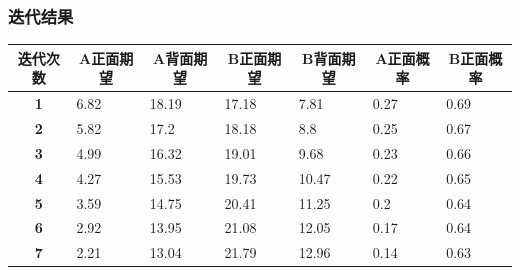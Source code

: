 \documentclass[UTF8]{ctexbeamer}
\numberwithin{equation}{section}  %
\begin{document}
\begin{frame}
    \frametitle{迭代结果}
\begin{table}[htbp]
    \centering
\begin{tabular}{cllllll}
        \toprule
\textbf{迭代次数} & \multicolumn{1}{c}{\textbf{A正面期望}} & \multicolumn{1}{c}{\textbf{A背面期望}} & \multicolumn{1}{c}{\textbf{B正面期望}} & \multicolumn{1}{c}{\textbf{B背面期望}} & \multicolumn{1}{c}{\textbf{A正面概率}} & \multicolumn{1}{c}{\textbf{B正面概率}} \\
        \midrule
\textbf{1}    & 6.82                               & 18.19                              & 17.18                              & 7.81                               & 0.27                               & 0.69                               \\
        \midrule
\textbf{2}    & 5.82                               & 17.2                               & 18.18                              & 8.8                                & 0.25                               & 0.67                               \\
        \midrule
\textbf{3}    & 4.99                               & 16.32                              & 19.01                              & 9.68                               & 0.23                               & 0.66                               \\
        \midrule
\textbf{4}    & 4.27                               & 15.53                              & 19.73                              & 10.47                              & 0.22                               & 0.65                               \\
        \midrule
\textbf{5}    & 3.59                               & 14.75                              & 20.41                              & 11.25                              & 0.2                                & 0.64                               \\
        \midrule
\textbf{6}    & 2.92                               & 13.95                              & 21.08                              & 12.05                              & 0.17                               & 0.64                               \\
        \midrule
\textbf{7}    & 2.21                               & 13.04                              & 21.79                              & 12.96                              & 0.14                               & 0.63                               \\

\end{tabular}
\end{table}
\end{frame}
\end{document}
